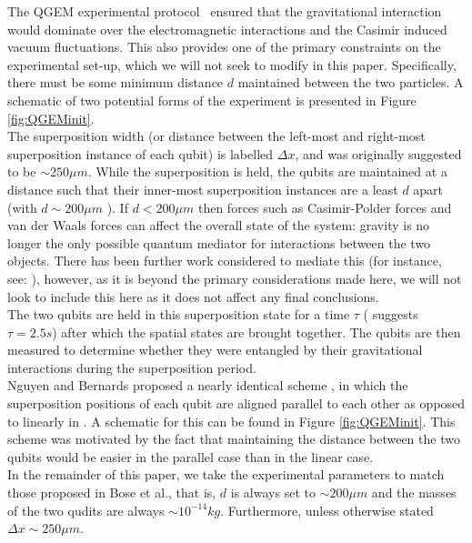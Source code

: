 \documentclass[%
 12pt,
 superscriptaddress,
 amsmath,
 amssymb,
 onecolumn,
 longbibliography
]{revtex4-2}
\begin{document}
The QGEM experimental protocol~\cite{Bose2017,Kamp2020} ensured that the gravitational interaction would dominate over the electromagnetic interactions and the Casimir induced vacuum fluctuations. 
This also provides one of the primary constraints on the experimental set-up, which we will not seek to modify in this paper. Specifically, there must be some minimum distance $d$ maintained between the two particles. A schematic of two potential forms of the experiment is presented in Figure \ref{fig:QGEMinit}. \\
\indent The superposition width (or distance between the left-most and right-most superposition instance of each qubit) is labelled $\Delta x$, and was originally suggested to be $\sim 250 \mu m$\cite{Bose2017}. While the superposition is held, the qubits are maintained at a distance such that their inner-most superposition instances are a least $d$ apart (with $d\sim 200 \mu m$ \cite{Bose2017}). If $d<200 \mu m$ then forces such as Casimir-Polder forces and van der Waals forces can affect the overall state of the system: gravity is no longer the only possible quantum mediator for interactions between the two objects. There has been further work considered to mediate this (for instance, see: \cite{Kamp2020}), however, as it is beyond the primary considerations made here, we will not look to include this here as it does not affect any final conclusions. \\
\indent The two qubits are held in this superposition state for a time $\tau$ (\cite{Bose2017} suggests $\tau=2.5s$) after which the spatial states are brought together. The qubits are then measured to determine whether they were entangled by their gravitational interactions during the superposition period. \\
\indent Nguyen and Bernards proposed a nearly identical scheme \cite{Nguyen2019}, in which the superposition positions of each qubit are aligned parallel to each other as opposed to linearly in \cite{Bose2017,Kamp2020}. A schematic for this can be found in Figure \ref{fig:QGEMinit}. This scheme was motivated by the fact that maintaining the distance between the two qubits would be easier in the parallel case than in the linear case. \\
\indent In the remainder of this paper, we take the experimental parameters to match those proposed in Bose et al., that is, $d$ is always set to $\sim200 \mu m $ and the masses of the two qudits are always $\sim10^{-14} kg$. Furthermore, unless otherwise stated $\Delta x\sim250 \mu m$.\\ 
\end{document}

